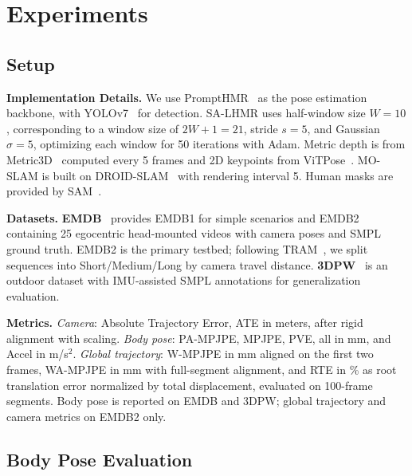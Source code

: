 \documentclass[runningheads]{llncs}
\begin{document}
\section{Experiments}
\label{sec:experiments}

\subsection{Setup}
\label{sec:impl}

\noindent\textbf{Implementation Details.}
We use PromptHMR~\cite{PromptHMR2024} as the pose estimation backbone, with YOLOv7~\cite{YOLO} for detection. SA-LHMR uses half-window size $W{=}10$, corresponding to a window size of $2W{+}1{=}21$, stride $s{=}5$, and Gaussian $\sigma{=}5$, optimizing each window for 50 iterations with Adam. Metric depth is from Metric3D~\cite{Metric3D2024} computed every 5 frames and 2D keypoints from ViTPose~\cite{ViTPose2022}. MO-SLAM is built on DROID-SLAM~\cite{DROIDSLAM2021} with rendering interval 5. Human masks are provided by SAM~\cite{SAM2023}.

\noindent\textbf{Datasets.}
\textbf{EMDB}~\cite{EMDB2023} provides EMDB1 for simple scenarios and EMDB2 containing 25 egocentric head-mounted videos with camera poses and SMPL ground truth. EMDB2 is the primary testbed; following TRAM~\cite{TRAM2024}, we split sequences into Short/Medium/Long by camera travel distance.
\textbf{3DPW}~\cite{3DPW2018} is an outdoor dataset with IMU-assisted SMPL annotations for generalization evaluation.

\noindent\textbf{Metrics.}
\emph{Camera}: Absolute Trajectory Error, ATE in meters, after rigid alignment with scaling.
\emph{Body pose}: PA-MPJPE, MPJPE, PVE, all in mm, and Accel in m/s$^2$.
\emph{Global trajectory}: W-MPJPE in mm aligned on the first two frames, WA-MPJPE in mm with full-segment alignment, and RTE in \% as root translation error normalized by total displacement, evaluated on 100-frame segments. Body pose is reported on EMDB and 3DPW; global trajectory and camera metrics on EMDB2 only.


\subsection{Body Pose Evaluation}
\label{sec:exp-pose}
\end{document}
